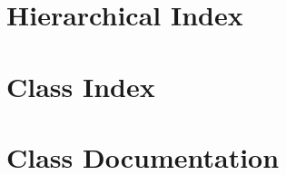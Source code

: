 \documentclass[twoside]{book}
\newcommand{\+}{\discretionary{\mbox{\scriptsize$\hookleftarrow$}}{}{}}
\newcommand{\clearemptydoublepage}{%
  \newpage{\pagestyle{empty}\cleardoublepage}%
}
\begin{document}
\chapter{Hierarchical Index}

\chapter{Class Index}

\chapter{Class Documentation}














\backmatter
\newpage
{}
\clearemptydoublepage
{}
\printindex
\end{document}
